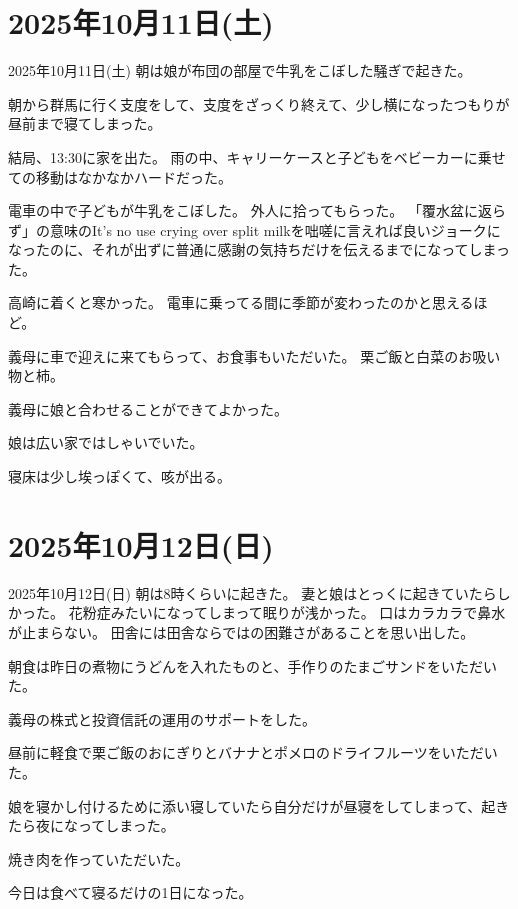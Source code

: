 \documentclass[dvipdfmx, autodetect-engine, aspectratio=169, 10.5pt]{beamer}
\begin{document}
\section{2025年10月11日(土)}

\begin{frame}{2025年10月11日(土)}
朝は娘が布団の部屋で牛乳をこぼした騒ぎで起きた。

朝から群馬に行く支度をして、支度をざっくり終えて、少し横になったつもりが昼前まで寝てしまった。

結局、13:30に家を出た。
雨の中、キャリーケースと子どもをベビーカーに乗せての移動はなかなかハードだった。

電車の中で子どもが牛乳をこぼした。
外人に拾ってもらった。
「覆水盆に返らず」の意味のIt's no use crying over split milkを咄嗟に言えれば良いジョークになったのに、それが出ずに普通に感謝の気持ちだけを伝えるまでになってしまった。

高崎に着くと寒かった。
電車に乗ってる間に季節が変わったのかと思えるほど。

義母に車で迎えに来てもらって、お食事もいただいた。
栗ご飯と白菜のお吸い物と柿。

義母に娘と合わせることができてよかった。

娘は広い家ではしゃいでいた。

寝床は少し埃っぽくて、咳が出る。
\end{frame}

\section{2025年10月12日(日)}

\begin{frame}{2025年10月12日(日)}
朝は8時くらいに起きた。
妻と娘はとっくに起きていたらしかった。
花粉症みたいになってしまって眠りが浅かった。
口はカラカラで鼻水が止まらない。
田舎には田舎ならではの困難さがあることを思い出した。

朝食は昨日の煮物にうどんを入れたものと、手作りのたまごサンドをいただいた。

義母の株式と投資信託の運用のサポートをした。

昼前に軽食で栗ご飯のおにぎりとバナナとポメロのドライフルーツをいただいた。

娘を寝かし付けるために添い寝していたら自分だけが昼寝をしてしまって、起きたら夜になってしまった。

焼き肉を作っていただいた。

今日は食べて寝るだけの1日になった。
\end{frame}
\end{document}
